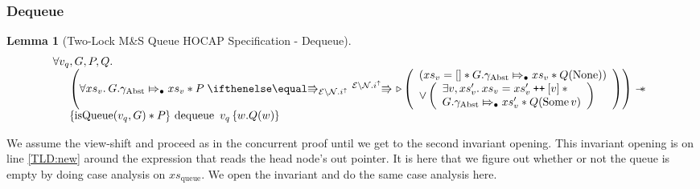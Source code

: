 \documentclass[a4paper, 10pt]{report}
\theoremstyle{definition}
\newtheorem{lemma}[theorem]{Lemma}
\newcommand{\dequeue}{\operatorname{dequeue}}
\newcommand{\msq}{M\&S Queue}
\newcommand{\tlmsq}{Two-Lock \msq{}}
\newcommand{\isqueue}{\operatorname{isQueue}}
\newcommand{\vq}{v_q}
\newcommand{\xsqueue}{xs_{\mathrm{queue}}}
\newcommand{\nodeval}{\valB}
\newcommand{\absvalue}{\val}
\newcommand{\absvalueList}{xs_v}
\newcommand{\Qg}{G}
\newcommand{\gabst}{\gname_{\mathrm{Abst}}}
\newcommand\catenate{\mathbin{\text{\ttfamily\upshape ++}}}
\newcommand{\Nl}{\ensuremath{\mathcal{N}}}
\newcommand{\abstractstateauth}[2]{#1 \Mapsto_{\bullet} #2}
\newcommand{\hocapspecdeqVSGen}[6]{
  \abstractstateauth{#1.\gabst}{#4} \star{} #2 \vs[\mask\setminus\Nl.i^\uparrow] \later
  \left(
    \begin{array}{l}
      (#4 = [] \star{} \abstractstateauth{#1.\gabst}{#4} \star{} #3(\None))\\
      \lor{}
      \left(
        \begin{array}{l}
          \Exists #5, #6 . #4 = #6 \catenate [#5] \star{}\\
          \abstractstateauth{#1.\gabst}{#6} \star{} #3(\Some{#5})
        \end{array}
        \right)
    \end{array}
  \right)
}
\newcommand{\hocapspecdeqVS}[4]{\hocapspecdeqVSGen{#1}{#2}{#3}{#4}{\absvalue}{#4'}}
\newcommand{\hocapspecdeqHT}[4]{\hoare{\isqueue(#1, #2) \star{} #3}{\dequeue \ #1}{\nodeval . #4(\nodeval)}}
\newcommand{\hocapspecdeqGen}[5]{\begin{array}[t]{l}
  \All #1, #2, #3, #4.\\
  \begin{array}[t]{l}
  \quad\left(\All #5 . \hocapspecdeqVS{#2}{#3}{#4}{#5} \right) \wand\\
  \quad\hocapspecdeqHT{#1}{#2}{#3}{#4}
  \end{array}
\end{array}}
\newcommand{\hocapspecdeq}{\hocapspecdeqGen{\vq}{\Qg}{P}{Q}{\absvalueList}}
\begin{document}
\subsubsection{Dequeue}
\begin{lemma}[\tlmsq{} HOCAP Specification - Dequeue]\label{TLMSQ:spec:hocap:dequeue}
  \begin{equation*}
    \hocapspecdeq
  \end{equation*}
\end{lemma}
We assume the view-shift and proceed as in the concurrent proof until we get to the second invariant opening. This invariant opening is on line \ref{TLD:new} around the expression that reads the head node's out pointer. It is here that we figure out whether or not the queue is empty by doing case analysis on $\xsqueue$. We open the invariant and do the same case analysis here.
\end{document}
